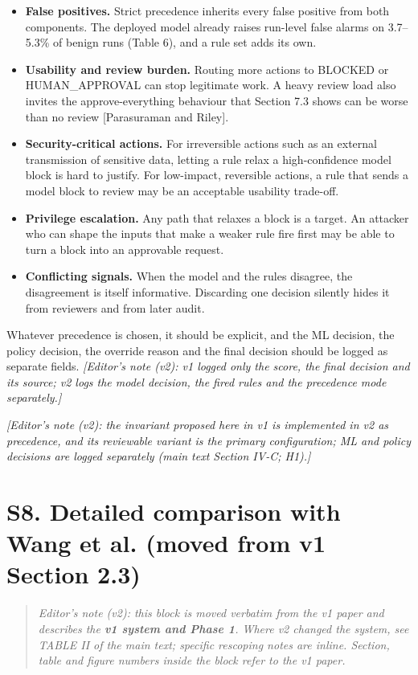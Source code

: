 \documentclass[10pt]{article}
\begin{document}
\begin{itemize}
\item \textbf{False positives.} Strict precedence inherits every false positive from both components. The deployed model already raises run-level false alarms on 3.7--5.3\% of benign runs (Table 6), and a rule set adds its own.
\item \textbf{Usability and review burden.} Routing more actions to BLOCKED or HUMAN\_APPROVAL can stop legitimate work. A heavy review load also invites the approve-everything behaviour that Section 7.3 shows can be worse than no review [Parasuraman and Riley].
\item \textbf{Security-critical actions.} For irreversible actions such as an external transmission of sensitive data, letting a rule relax a high-confidence model block is hard to justify. For low-impact, reversible actions, a rule that sends a model block to review may be an acceptable usability trade-off.
\item \textbf{Privilege escalation.} Any path that relaxes a block is a target. An attacker who can shape the inputs that make a weaker rule fire first may be able to turn a block into an approvable request.
\item \textbf{Conflicting signals.} When the model and the rules disagree, the disagreement is itself informative. Discarding one decision silently hides it from reviewers and from later audit.
\end{itemize}

Whatever precedence is chosen, it should be explicit, and the ML decision, the policy decision, the override reason and the final decision should be logged as separate fields. \emph{[Editor's note (v2): v1 logged only the score, the final decision and its source; v2 logs the model decision, the fired rules and the precedence mode separately.]}

\emph{[Editor's note (v2): the invariant proposed here in v1 is implemented in v2 as  precedence, and its reviewable variant is the primary configuration; ML and policy decisions are logged separately (main text Section IV-C; H1).]}

\section*{S8. Detailed comparison with Wang et al. (moved from v1 Section 2.3)}

\begin{quote}\small \emph{Editor's note (v2): this block is moved verbatim from the v1 paper and describes the \textbf{v1 system and Phase 1}. Where v2 changed the system, see TABLE II of the main text; specific rescoping notes are inline. Section, table and figure numbers inside the block refer to the v1 paper.}\end{quote}
\end{document}
